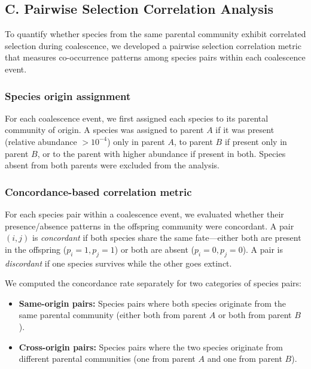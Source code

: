 \subsection*{C. Pairwise Selection Correlation Analysis}
\label{sec:suppl:pairwise_correlation}

To quantify whether species from the same parental community exhibit correlated selection during coalescence, we developed a pairwise selection correlation metric that measures co-occurrence patterns among species pairs within each coalescence event.

\subsubsection*{Species origin assignment}

For each coalescence event, we first assigned each species to its parental community of origin. A species was assigned to parent $A$ if it was present (relative abundance $> 10^{-4}$) only in parent $A$, to parent $B$ if present only in parent $B$, or to the parent with higher abundance if present in both. Species absent from both parents were excluded from the analysis.

\subsubsection*{Concordance-based correlation metric}

For each species pair within a coalescence event, we evaluated whether their presence/absence patterns in the offspring community were concordant. A pair $(i, j)$ is \textit{concordant} if both species share the same fate---either both are present in the offspring ($p_i = 1, p_j = 1$) or both are absent ($p_i = 0, p_j = 0$). A pair is \textit{discordant} if one species survives while the other goes extinct.

We computed the concordance rate separately for two categories of species pairs:
\begin{itemize}
    \item \textbf{Same-origin pairs:} Species pairs where both species originate from the same parental community (either both from parent $A$ or both from parent $B$).
    \item \textbf{Cross-origin pairs:} Species pairs where the two species originate from different parental communities (one from parent $A$ and one from parent $B$).
\end{itemize}

